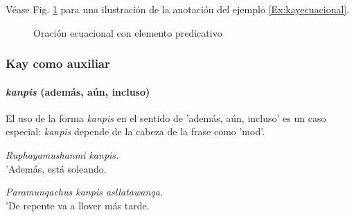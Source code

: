 \documentclass[a4paper,11pt,DIV12]{scrartcl}
\begin{document}
V\'ease Fig. \ref{Fig:kayecuacional} para una ilustraci\'on de la anotaci\'on del ejemplo \ref{Ex:kayecuacional}.
 
\begin{figure}
\begin{center}
\caption{Oraci\'on ecuacional con elemento predicativo}\label{Fig:kayecuacional}
\end{center}
\end{figure}

  \subsubsection{Kay como auxiliar}
\paragraph{{\em kanpis} (adem\'as, a\'un, incluso)}

El uso de la forma {\em kanpis} en el sentido de 'adem\'as, a\'un, incluso' es un caso especial: {\em kanpis} depende de la cabeza de la frase como 'mod'.

\begin{examples}
 \item {\em Ruphayamushanmi kanpis.}\\
	'Adem\'as, est\'a soleando.
 \item {\em Paramunqachus kanpis asllatawanqa.}\\
      'De repente va a llover m\'as tarde.\\
 	\hfill{\small \citep[210]{Cusi2}}
\end{examples}
\end{document}
